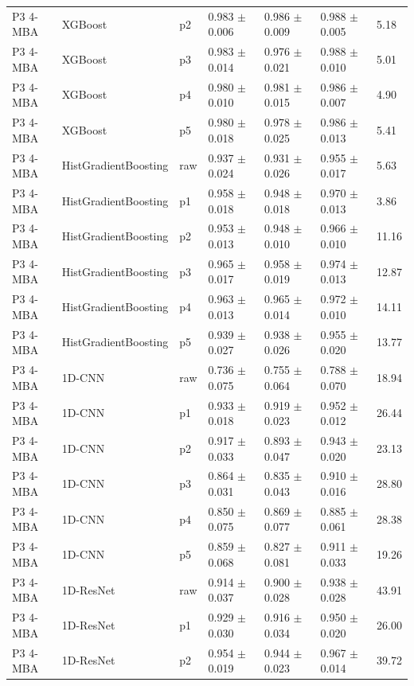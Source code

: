 {\begin{longtable}{L{2.35cm}L{2.4cm}L{1.0cm}L{2.35cm}L{2.25cm}L{2.25cm}L{1.45cm}}
P3 4-MBA & XGBoost & p2 & 0.983 $\pm$ 0.006 & 0.986 $\pm$ 0.009 & 0.988 $\pm$ 0.005 & 5.18 \\
P3 4-MBA & XGBoost & p3 & 0.983 $\pm$ 0.014 & 0.976 $\pm$ 0.021 & 0.988 $\pm$ 0.010 & 5.01 \\
P3 4-MBA & XGBoost & p4 & 0.980 $\pm$ 0.010 & 0.981 $\pm$ 0.015 & 0.986 $\pm$ 0.007 & 4.90 \\
P3 4-MBA & XGBoost & p5 & 0.980 $\pm$ 0.018 & 0.978 $\pm$ 0.025 & 0.986 $\pm$ 0.013 & 5.41 \\
P3 4-MBA & HistGradientBoosting & raw & 0.937 $\pm$ 0.024 & 0.931 $\pm$ 0.026 & 0.955 $\pm$ 0.017 & 5.63 \\
P3 4-MBA & HistGradientBoosting & p1 & 0.958 $\pm$ 0.018 & 0.948 $\pm$ 0.018 & 0.970 $\pm$ 0.013 & 3.86 \\
P3 4-MBA & HistGradientBoosting & p2 & 0.953 $\pm$ 0.013 & 0.948 $\pm$ 0.010 & 0.966 $\pm$ 0.010 & 11.16 \\
P3 4-MBA & HistGradientBoosting & p3 & 0.965 $\pm$ 0.017 & 0.958 $\pm$ 0.019 & 0.974 $\pm$ 0.013 & 12.87 \\
P3 4-MBA & HistGradientBoosting & p4 & 0.963 $\pm$ 0.013 & 0.965 $\pm$ 0.014 & 0.972 $\pm$ 0.010 & 14.11 \\
P3 4-MBA & HistGradientBoosting & p5 & 0.939 $\pm$ 0.027 & 0.938 $\pm$ 0.026 & 0.955 $\pm$ 0.020 & 13.77 \\
P3 4-MBA & 1D-CNN & raw & 0.736 $\pm$ 0.075 & 0.755 $\pm$ 0.064 & 0.788 $\pm$ 0.070 & 18.94 \\
P3 4-MBA & 1D-CNN & p1 & 0.933 $\pm$ 0.018 & 0.919 $\pm$ 0.023 & 0.952 $\pm$ 0.012 & 26.44 \\
P3 4-MBA & 1D-CNN & p2 & 0.917 $\pm$ 0.033 & 0.893 $\pm$ 0.047 & 0.943 $\pm$ 0.020 & 23.13 \\
P3 4-MBA & 1D-CNN & p3 & 0.864 $\pm$ 0.031 & 0.835 $\pm$ 0.043 & 0.910 $\pm$ 0.016 & 28.80 \\
P3 4-MBA & 1D-CNN & p4 & 0.850 $\pm$ 0.075 & 0.869 $\pm$ 0.077 & 0.885 $\pm$ 0.061 & 28.38 \\
P3 4-MBA & 1D-CNN & p5 & 0.859 $\pm$ 0.068 & 0.827 $\pm$ 0.081 & 0.911 $\pm$ 0.033 & 19.26 \\
P3 4-MBA & 1D-ResNet & raw & 0.914 $\pm$ 0.037 & 0.900 $\pm$ 0.028 & 0.938 $\pm$ 0.028 & 43.91 \\
P3 4-MBA & 1D-ResNet & p1 & 0.929 $\pm$ 0.030 & 0.916 $\pm$ 0.034 & 0.950 $\pm$ 0.020 & 26.00 \\
P3 4-MBA & 1D-ResNet & p2 & 0.954 $\pm$ 0.019 & 0.944 $\pm$ 0.023 & 0.967 $\pm$ 0.014 & 39.72 \\

\end{longtable}}
